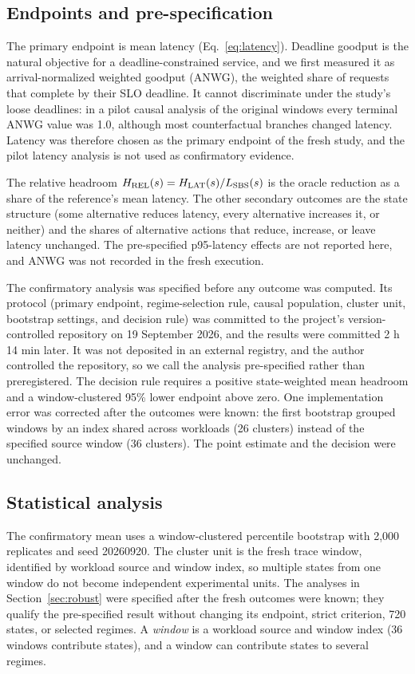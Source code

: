 \documentclass[preprint,12pt]{elsarticle}
\begin{document}
\subsection{Endpoints and pre-specification}
\label{sec:endpoint}
The primary endpoint is mean latency (Eq.~\ref{eq:latency}). Deadline goodput is
the natural objective for a deadline-constrained service, and we first measured
it as arrival-normalized weighted goodput (ANWG), the weighted share of requests
that complete by their SLO deadline. It cannot discriminate under the study's
loose deadlines: in a pilot causal analysis of the original windows every
terminal ANWG value was 1.0, although most counterfactual branches changed
latency. Latency was therefore chosen as the primary endpoint of the fresh
study, and the pilot latency analysis is not used as confirmatory evidence.

The relative headroom $H_{\mathrm{REL}}(s)=H_{\mathrm{LAT}}(s)/L_{\mathrm{SBS}}(s)$ is
the oracle reduction as a share of the reference's mean latency. The other
secondary outcomes are the state structure (some alternative reduces latency,
every alternative increases it, or neither) and the shares of alternative
actions that reduce, increase, or leave latency unchanged. The pre-specified
p95-latency effects are not reported here, and ANWG was not recorded in the
fresh execution.

The confirmatory analysis was specified before any outcome was computed. Its
protocol (primary endpoint, regime-selection rule, causal population, cluster
unit, bootstrap settings, and decision rule) was committed to the project's
version-controlled repository on 19 September 2026, and the results were
committed 2 h 14 min later. It was not deposited in an external registry, and
the author controlled the repository, so we call the analysis pre-specified
rather than preregistered. The decision rule requires a positive state-weighted
mean headroom and a window-clustered 95\% lower endpoint above zero. One
implementation error was corrected after the outcomes were known: the first
bootstrap grouped windows by an index shared across workloads (26 clusters)
instead of the specified source window (36 clusters). The point estimate and the
decision were unchanged.

\subsection{Statistical analysis}
\label{sec:posthoc}
The confirmatory mean uses a window-clustered percentile bootstrap with 2,000
replicates and seed 20260920. The cluster unit is the fresh trace window,
identified by workload source and window index, so multiple states from one
window do not become independent experimental units. The analyses in
Section~\ref{sec:robust} were specified after the fresh outcomes were known;
they qualify the pre-specified result without changing its endpoint, strict
criterion, 720 states, or selected regimes. A \emph{window} is a workload source
and window index (36 windows contribute states), and a window can contribute
states to several regimes.
\end{document}
